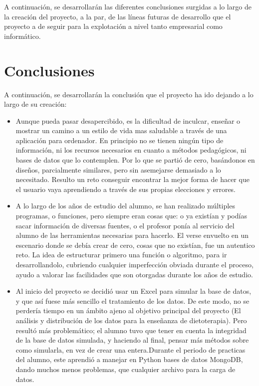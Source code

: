 
A continuación, se desarrollarán las diferentes conclusiones surgidas a lo largo de la creación del proyecto, a la par, de las líneas futuras de desarrollo que el proyecto a de seguir para la explotación a nivel tanto empresarial como informático.
\\
\section{Conclusiones}
A continuación, se desarrollarán la conclusión que el proyecto ha ido dejando a lo largo de su creación:
\begin{itemize}
\item	Aunque pueda pasar desapercibido, es la dificultad de inculcar, enseñar o mostrar un camino a un estilo de vida mas saludable a través de una aplicación para ordenador. En principio no se tienen ningún tipo de información, ni los recursos necesarios en cuanto a métodos pedagógicos, ni bases de datos que lo contemplen. Por lo que se partió de cero, basándonos en diseños, parcialmente similares, pero sin asemejarse demasiado a lo necesitado. Resulto un reto conseguir encontrar la mejor forma de hacer que el usuario vaya aprendiendo a través de sus propias elecciones y errores.
\item	A lo largo de los años de estudio del alumno, se han realizado múltiples programas, o funciones, pero siempre eran cosas que: o ya existían y podías sacar información de diversas fuentes, o el profesor ponía al servicio del alumno de las herramientas necesarias para hacerlo. El verse envuelto en un escenario donde se debía crear de cero, cosas que no existían, fue un autentico reto. La idea de estructurar primero una función o algoritmo, para ir desarrollandolo, cubriendo cualquier imperfección obviada durante el proceso, ayudo a valorar las facilidades que son otorgadas durante los años de estudio.
\item	Al inicio del proyecto se decidió usar un Excel para simular la base de datos, y que así fuese más sencillo el tratamiento de los datos. De este modo, no se perdería tiempo en un ámbito ajeno al objetivo principal del proyecto (El análisis y distribución de los datos para la enseñanza de dietoterapia). Pero resultó más problemático; el alumno tuvo que tener en cuenta la integridad de la base de datos simulada, y haciendo al final, pensar más métodos sobre como simularla, en vez de crear una entera.Durante el periodo de practicas del alumno, este aprendió a manejar en Python bases de datos MongoDB, dando muchos menos problemas, que cualquier archivo para la carga de datos.

\end{itemize}

